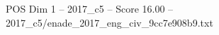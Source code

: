 \begin{textsample}{POS Dim 1 – 2017\_c5 – Score 16.00 – 2017\_c5/enade\_2017\_eng\_civ\_9cc7e908b9.txt}
\end{textsample}
